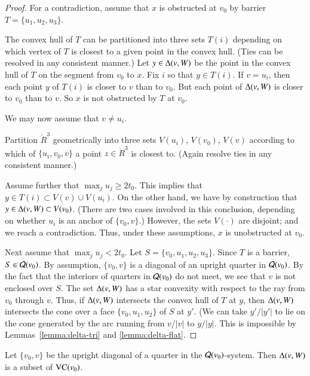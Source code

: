 \begin{proof} For a contradiction, assume that $x$ is obstructed
at $v_0$ by barrier $T =\{u_1,u_2,u_3\}$.


The convex hull of $T$ can be partitioned into three sets $T(i)$
depending on which vertex of $T$ is closest to a given point in
the convex hull. (Ties can be resolved in any consistent manner.)
Let $y\in \Delta(v,W)$ be the point in the convex hull of $T$ on
the segment from $v_0$ to $x$.  Fix $i$ so that $y\in T(i)$. If
$v=u_i$, then each point $y$ of $T(i)$ is closer to $v$ than to
$v_0$.  But each point of $\Delta(v,W)$ is closer to $v_0$ than to
$v$.  So $x$ is not obstructed by $T$ at $v_0$.

We may now assume that $v\ne u_i$.

Partition $\ring{R}^3$ geometrically into three sets $V(u_i)$,
$V(v_0)$, $V(v)$ according to which of $\{u_i,v_0,v\}$ a point
$z\in\ring{R}^3$ is closest to.  (Again resolve ties in any
consistent manner.)

Assume further that $\max_j u_j \ge 2t_0$. This implies that $y\in
T(i) \subset V(v) \cup V(u_i)$.  On the other hand, we have by
construction that $y\in \Delta(v,W) \subset V(v_0)$.  (There are
two cases involved in this conclusion, depending on whether $u_i$
is an anchor of $\{v_0,v\}$.)  However, the sets $V(\cdot)$ are
disjoint; and we reach a contradiction.  Thus, under these
assumptions, $x$ is unobstructed at $v_0$.

Next assume that $\max_j u_j < 2t_0$.  Let $S=\{v_0,u_1,u_2,u_3\}$.
Since $T$ is a barrier, $S\in{\mathcal Q}(v_0)$.  By assumption, $\{v_0,v\}$
is a diagonal of an upright quarter in ${\mathcal Q}(v_0)$.  By the fact
that the interiors of quarters in ${\mathcal Q}(v_0)$ do not meet, we see
that $v$ is not enclosed over $S$.  The set $\Delta(v,W)$ has
a star convexity with respect to the ray from $v_0$ through $v$.
Thus, if $\Delta(v,W)$ intersects the convex hull of
$T$ at $y$, then $\Delta(v,W)$ intersects the cone over a face
$\{v_0,u_1,u_2\}$ of $S$ at $y'$. (We can take $y'/|y'|$ to lie on
the cone generated by the arc running from $v/|v|$ to $y/|y|$.
This is impossible by Lemmas~\ref{lemma:delta-tri} and
\ref{lemma:delta-flat}.
\end{proof}

\begin{lemma}  Let $\{v_0,v\}$ be the upright diagonal of a quarter
in the ${\mathcal Q}(v_0)$-system.  Then $\Delta(v,W)$ is
a subset of ${\operatorname{VC}}(v_0)$.
\end{lemma}

